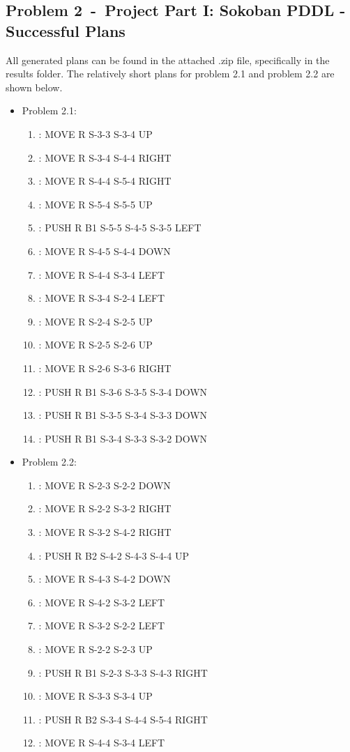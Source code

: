\documentclass[12pt]{article}
\newcommand{\problem}[2]{\section*{Problem {#1}~-~{#2}}}
\begin{document}
\newpage
\begin{appendix}
\problem{2}{Project Part I: Sokoban PDDL - Successful Plans}
  All generated plans can be found in the attached .zip file, specifically in the results folder. The relatively short plans for problem 2.1 and problem 2.2 are shown below. 
  \begin{itemize}
    \item Problem 2.1:
      \begin{enumerate}
	\item: MOVE R S-3-3 S-3-4 UP
	\item: MOVE R S-3-4 S-4-4 RIGHT
	\item: MOVE R S-4-4 S-5-4 RIGHT
	\item: MOVE R S-5-4 S-5-5 UP
	\item: PUSH R B1 S-5-5 S-4-5 S-3-5 LEFT
	\item: MOVE R S-4-5 S-4-4 DOWN
	\item: MOVE R S-4-4 S-3-4 LEFT
	\item: MOVE R S-3-4 S-2-4 LEFT
	\item: MOVE R S-2-4 S-2-5 UP
	\item: MOVE R S-2-5 S-2-6 UP
	\item : MOVE R S-2-6 S-3-6 RIGHT
	\item: PUSH R B1 S-3-6 S-3-5 S-3-4 DOWN
	\item: PUSH R B1 S-3-5 S-3-4 S-3-3 DOWN
	\item: PUSH R B1 S-3-4 S-3-3 S-3-2 DOWN
      \end{enumerate}
    \item Problem 2.2:
      \begin{enumerate}
	\item: MOVE R S-2-3 S-2-2 DOWN
	\item: MOVE R S-2-2 S-3-2 RIGHT
	\item: MOVE R S-3-2 S-4-2 RIGHT
	\item: PUSH R B2 S-4-2 S-4-3 S-4-4 UP
	\item: MOVE R S-4-3 S-4-2 DOWN
	\item: MOVE R S-4-2 S-3-2 LEFT
	\item: MOVE R S-3-2 S-2-2 LEFT
	\item: MOVE R S-2-2 S-2-3 UP
	\item: PUSH R B1 S-2-3 S-3-3 S-4-3 RIGHT
	\item: MOVE R S-3-3 S-3-4 UP
	\item: PUSH R B2 S-3-4 S-4-4 S-5-4 RIGHT
	\item: MOVE R S-4-4 S-3-4 LEFT

\end{enumerate}
\end{itemize}
\end{appendix}
\end{document}
